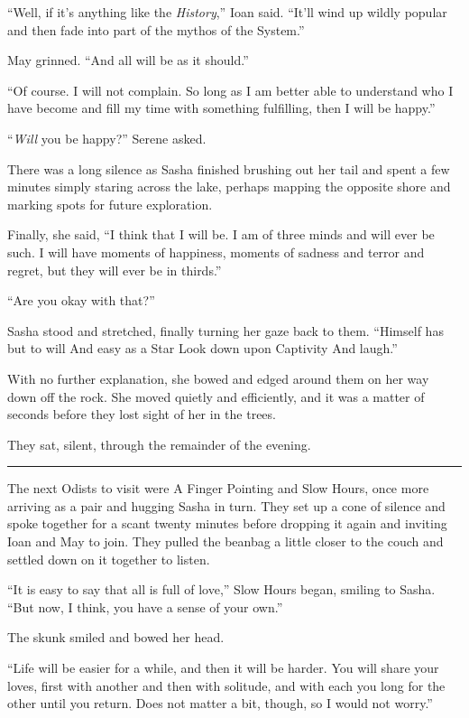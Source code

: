 ``Well, if it's anything like the \emph{History},'' Ioan said. ``It'll wind up wildly popular and then fade into part of the mythos of the System.''

May grinned. ``And all will be as it should.''

``Of course. I will not complain. So long as I am better able to understand who I have become and fill my time with something fulfilling, then I will be happy.''

``\emph{Will} you be happy?'' Serene asked.

There was a long silence as Sasha finished brushing out her tail and spent a few minutes simply staring across the lake, perhaps mapping the opposite shore and marking spots for future exploration.

Finally, she said, ``I think that I will be. I am of three minds and will ever be such. I will have moments of happiness, moments of sadness and terror and regret, but they will ever be in thirds.''

``Are you okay with that?''

Sasha stood and stretched, finally turning her gaze back to them. ``Himself has but to will And easy as a Star Look down upon Captivity And laugh.''

With no further explanation, she bowed and edged around them on her way down off the rock. She moved quietly and efficiently, and it was a matter of seconds before they lost sight of her in the trees.

They sat, silent, through the remainder of the evening.

\begin{center}\rule{0.5\linewidth}{0.5pt}\end{center}

The next Odists to visit were A Finger Pointing and Slow Hours, once more arriving as a pair and hugging Sasha in turn. They set up a cone of silence and spoke together for a scant twenty minutes before dropping it again and inviting Ioan and May to join. They pulled the beanbag a little closer to the couch and settled down on it together to listen.

``It is easy to say that all is full of love,'' Slow Hours began, smiling to Sasha. ``But now, I think, you have a sense of your own.''

The skunk smiled and bowed her head.

``Life will be easier for a while, and then it will be harder. You will share your loves, first with another and then with solitude, and with each you long for the other until you return. Does not matter a bit, though, so I would not worry.''

